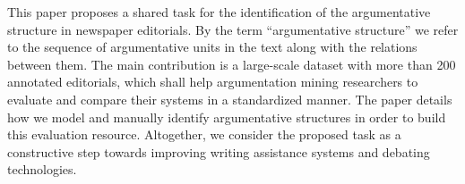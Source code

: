 This paper proposes a shared task for the identification of the argumentative structure in newspaper editorials. By the term ``argumentative structure'' we refer to the sequence of argumentative units in the text along with the relations between them. The main contribution is a large-scale dataset with more than 200 annotated editorials, which shall help argumentation mining researchers to evaluate and compare their systems in a standardized manner. The paper details how we model and manually identify argumentative structures in order to build this evaluation resource. Altogether, we consider the proposed task as a constructive step towards improving writing assistance systems and debating technologies.
